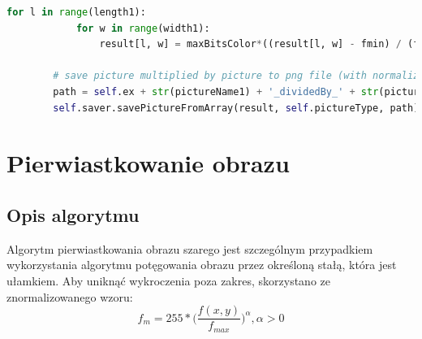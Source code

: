 \documentclass[a4paper,12pt, titlepage]{report}
\begin{document}
\begin{lstlisting}[language=Python]
        for l in range(length1):
            for w in range(width1):
                result[l, w] = maxBitsColor*((result[l, w] - fmin) / (fmax - fmin))

        # save picture multiplied by picture to png file (with normalization)
        path = self.ex + str(pictureName1) + '_dividedBy_' + str(pictureName2) + '_normalized.png'
        self.saver.savePictureFromArray(result, self.pictureType, path)
\end{lstlisting}

\section{Pierwiastkowanie obrazu}
\subsection*{Opis algorytmu}
\par Algorytm pierwiastkowania obrazu szarego jest szczególnym przypadkiem wykorzystania algorytmu potęgowania obrazu przez określoną stałą, która jest ułamkiem. Aby uniknąć wykroczenia poza zakres, skorzystano ze znormalizowanego wzoru: \[f_{m}=255*\Big(\frac{f(x,y)}{f_{max}}\Big)^{\alpha},  \alpha>0\]
\end{document}
